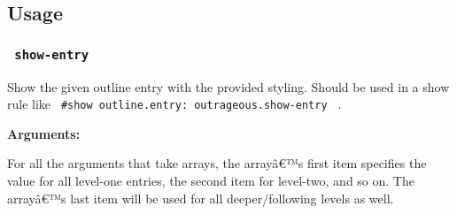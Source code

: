 \subsection{Usage}\label{usage}

\subsubsection{\texorpdfstring{\texttt{\ show-entry\ }}{ show-entry }}\label{show-entry}

Show the given outline entry with the provided styling. Should be used
in a show rule like
\texttt{\ \#show\ outline.entry:\ outrageous.show-entry\ } .

\begin{Shaded}
\begin{Highlighting}[]
\end{Highlighting}
\end{Shaded}

\textbf{Arguments:}

For all the arguments that take arrays, the arrayâ€™s first item
specifies the value for all level-one entries, the second item for
level-two, and so on. The arrayâ€™s last item will be used for all
deeper/following levels as well.

